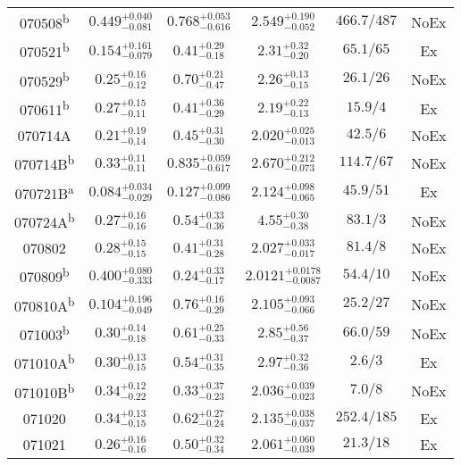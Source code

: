 \begin{longtable}{cccccc}
070508\textsuperscript{b} & $0.449^{+0.040}_{-0.081}$ & $0.768^{+0.053}_{-0.616}$ & $2.549^{+0.190}_{-0.052}$ & $466.7/487$ & NoEx\\[2pt] 
070521\textsuperscript{b} & $0.154^{+0.161}_{-0.079}$ & $0.41^{+0.29}_{-0.18}$ & $2.31^{+0.32}_{-0.20}$ & $65.1/65$ & Ex\\[2pt] 
070529\textsuperscript{b} & $0.25^{+0.16}_{-0.12}$ & $0.70^{+0.21}_{-0.47}$ & $2.26^{+0.13}_{-0.15}$ & $26.1/26$ & NoEx\\[2pt] 
070611\textsuperscript{b} & $0.27^{+0.15}_{-0.11}$ & $0.41^{+0.36}_{-0.29}$ & $2.19^{+0.22}_{-0.13}$ & $15.9/4$ & Ex\\[2pt] 
070714A & $0.21^{+0.19}_{-0.14}$ & $0.45^{+0.31}_{-0.30}$ & $2.020^{+0.025}_{-0.013}$ & $42.5/6$ & NoEx\\[2pt] 
070714B\textsuperscript{b} & $0.33^{+0.11}_{-0.11}$ & $0.835^{+0.059}_{-0.617}$ & $2.670^{+0.212}_{-0.073}$ & $114.7/67$ & NoEx\\[2pt] 
070721B\textsuperscript{a} & $0.084^{+0.034}_{-0.029}$ & $0.127^{+0.099}_{-0.086}$ & $2.124^{+0.098}_{-0.065}$ & $45.9/51$ & Ex\\[2pt] 
070724A\textsuperscript{b} & $0.27^{+0.16}_{-0.16}$ & $0.54^{+0.33}_{-0.36}$ & $4.55^{+0.30}_{-0.38}$ & $83.1/3$ & NoEx\\[2pt] 
070802 & $0.28^{+0.15}_{-0.15}$ & $0.41^{+0.31}_{-0.28}$ & $2.027^{+0.033}_{-0.017}$ & $81.4/8$ & NoEx\\[2pt] 
070809\textsuperscript{b} & $0.400^{+0.080}_{-0.333}$ & $0.24^{+0.33}_{-0.17}$ & $2.0121^{+0.0178}_{-0.0087}$ & $54.4/10$ & NoEx\\[2pt] 
070810A\textsuperscript{b} & $0.104^{+0.196}_{-0.049}$ & $0.76^{+0.16}_{-0.29}$ & $2.105^{+0.093}_{-0.066}$ & $25.2/27$ & NoEx\\[2pt] 
071003\textsuperscript{b} & $0.30^{+0.14}_{-0.18}$ & $0.61^{+0.25}_{-0.33}$ & $2.85^{+0.56}_{-0.37}$ & $66.0/59$ & NoEx\\[2pt] 
071010A\textsuperscript{b} & $0.30^{+0.13}_{-0.15}$ & $0.54^{+0.31}_{-0.35}$ & $2.97^{+0.32}_{-0.36}$ & $2.6/3$ & Ex\\[2pt] 
071010B\textsuperscript{b} & $0.34^{+0.12}_{-0.22}$ & $0.33^{+0.37}_{-0.23}$ & $2.036^{+0.039}_{-0.023}$ & $7.0/8$ & NoEx\\[2pt] 
071020 & $0.34^{+0.13}_{-0.15}$ & $0.62^{+0.27}_{-0.24}$ & $2.135^{+0.038}_{-0.037}$ & $252.4/185$ & Ex\\[2pt] 
071021 & $0.26^{+0.16}_{-0.16}$ & $0.50^{+0.32}_{-0.34}$ & $2.061^{+0.060}_{-0.039}$ & $21.3/18$ & Ex\\[2pt] 

\end{longtable}
